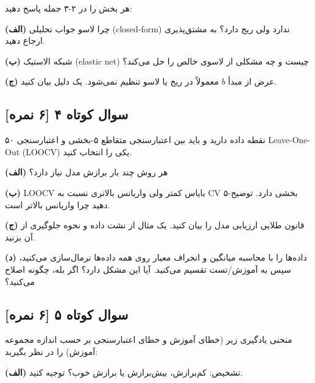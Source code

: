 \documentclass[12pt,a4paper]{article}
\begin{document}
هر بخش را در ۲-۳ جمله پاسخ دهید:

\textbf{(الف)} چرا لاسو جواب تحلیلی (closed-form) ندارد ولی ریج دارد؟ به مشتق‌پذیری ارجاع دهید.

\textbf{(ب)} شبکه الاستیک (elastic net) چیست و چه مشکلی از لاسوی خالص را حل می‌کند؟

\textbf{(ج)} عرض از مبدأ $b$ معمولاً در ریج یا لاسو تنظیم نمی‌شود. یک دلیل بیان کنید.

\bigskip

\subsection*{سوال کوتاه ۴ [۶ نمره]}

۵۰ نقطه داده دارید و باید بین اعتبارسنجی متقاطع ۵-بخشی و اعتبارسنجی Leave-One-Out (LOOCV) یکی را انتخاب کنید.

\textbf{(الف)} هر روش چند بار برازش مدل نیاز دارد؟

\textbf{(ب)} LOOCV بایاس کمتر ولی واریانس بالاتری نسبت به CV ۵-بخشی دارد. توضیح دهید چرا واریانس بالاتر است.

\textbf{(ج)} قانون طلایی ارزیابی مدل را بیان کنید. یک مثال از نشت داده و نحوه جلوگیری از آن بزنید.

\textbf{(د)} داده‌ها را با محاسبه میانگین و انحراف معیار روی همه داده‌ها نرمال‌سازی می‌کنید، سپس به آموزش/تست تقسیم می‌کنید. آیا این مشکل دارد؟ اگر بله، چگونه اصلاح می‌کنید؟

\bigskip

\subsection*{سوال کوتاه ۵ [۶ نمره]}

منحنی یادگیری زیر (خطای آموزش و خطای اعتبارسنجی بر حسب اندازه مجموعه آموزش) را در نظر بگیرید:

\begin{center}
\end{center}

\textbf{(الف)} تشخیص: کم‌برازش، بیش‌برازش یا برازش خوب؟ توجیه کنید.
\end{document}
